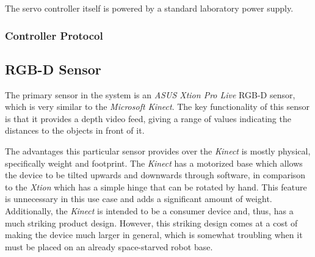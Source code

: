 The servo controller itself is powered by a standard laboratory power supply.

\subsubsection{Controller Protocol} 

\subsection{RGB-D Sensor}
The primary sensor in the system is an \emph{ASUS Xtion Pro Live} RGB-D sensor, which is very similar to the \emph{Microsoft Kinect}. The key functionality of this sensor is that it provides a depth video feed, giving a range of values indicating the distances to the objects in front of it.

The advantages this particular sensor provides over the \emph{Kinect} is mostly physical, specifically weight and footprint. The \emph{Kinect} has a motorized base which allows the device to be tilted upwards and downwards through software, in comparison to the \emph{Xtion} which has a simple hinge that can be rotated by hand. This feature is unnecessary in this use case and adds a significant amount of weight. Additionally, the \emph{Kinect} is intended to be a consumer device and, thus, has a much striking product design. However, this striking design comes at a cost of making the device much larger in general, which is somewhat troubling when it must be placed on an already space-starved robot base.
